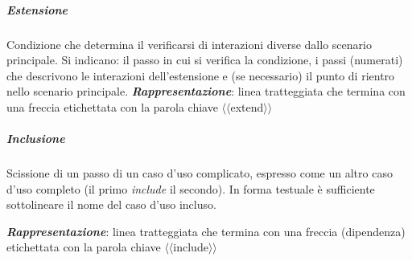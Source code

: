 \subparagraph{Estensione} Condizione che determina il verificarsi di interazioni diverse dallo scenario principale. Si indicano: il passo in cui si verifica la condizione, i passi (numerati) che descrivono le interazioni dell'estensione e (se necessario) il punto di rientro nello scenario principale.
\textbf{\textit{Rappresentazione}}: linea tratteggiata che termina con una freccia etichettata con la parola chiave $\langle\langle$extend$\rangle\rangle$

\begin{figure}[h!]
  \centering
  \hfill
\end{figure}

\subparagraph{Inclusione} Scissione di un passo di un caso d'uso complicato, espresso come un altro caso d'uso completo (il primo \textit{include} il secondo). In forma testuale è sufficiente sottolineare il nome del caso d'uso incluso.

\textbf{\textit{Rappresentazione}}: linea tratteggiata che termina con una freccia (dipendenza) etichettata con la parola chiave $\langle\langle$include$\rangle\rangle$

\newpage